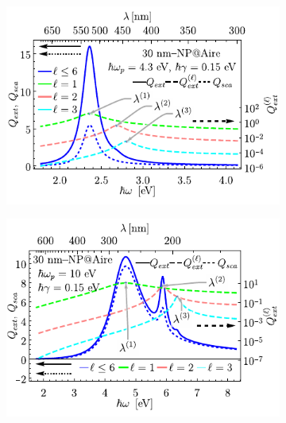 	\begin{figure}[h!]\centering\hspace*{-1.5em}
	\begin{subfigure}{.01\linewidth}\caption{}\label{sfig:Qext4-30}\vspace{3.75cm}\end{subfigure}
	\begin{subfigure}{.45\linewidth}\hspace*{-1.3em}
	\includegraphics[scale=1]{1-Teoria/figs/1-5-Drude4-ExtSca_30.pdf}
	\end{subfigure}
	\begin{subfigure}{.01\linewidth}\caption{}\label{sfig:Qext10-30}\vspace{3.75cm}\end{subfigure}
	\begin{subfigure}{.45\linewidth}\hspace*{-1em}
	\includegraphics[scale=1]{1-Teoria/figs/1-5-Drude10-ExtSca_30.pdf}

\end{subfigure}
\end{figure}
